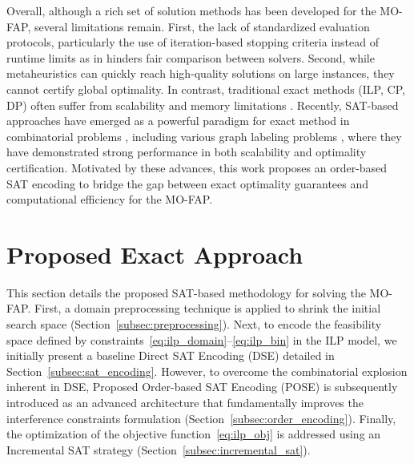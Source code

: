 \documentclass[letterpaper,journal]{IEEEtran}
\begin{document}
Overall, although a rich set of solution methods has been developed for the MO-FAP, several limitations remain. First, the lack of standardized evaluation protocols, particularly the use of iteration-based stopping criteria instead of runtime limits as in \cite{Gomez2023MO} hinders fair comparison between solvers. Second, while metaheuristics can quickly reach high-quality solutions on large instances, they cannot certify global optimality. In contrast, traditional exact methods (ILP, CP, DP) often suffer from scalability and memory limitations \cite{Aardal2007,Mahmoudi2023}. 
Recently, SAT-based approaches have emerged as a powerful paradigm for exact method in combinatorial problems \cite{fichte2023silent}, including various graph labeling problems \cite{glorian2019incremental, faber2024sat}, where they have demonstrated strong performance in both scalability and optimality certification. Motivated by these advances, this work proposes an order-based SAT encoding to bridge the gap between exact optimality guarantees and computational efficiency for the MO-FAP.

\section{Proposed Exact Approach}
\label{sec:method}
This section details the proposed SAT-based methodology for solving the MO-FAP.
First, a domain preprocessing technique is applied to shrink the initial search space (Section~\ref{subsec:preprocessing}). 
Next, to encode the feasibility space defined by constraints~\eqref{eq:ilp_domain}--\eqref{eq:ilp_bin} in the ILP model, we initially present a baseline Direct SAT Encoding (DSE) detailed in Section~\ref{subsec:sat_encoding}.
However, to overcome the combinatorial explosion inherent in DSE, Proposed Order-based SAT Encoding (POSE) is subsequently introduced as an advanced architecture that fundamentally improves the interference constraints formulation (Section~\ref{subsec:order_encoding}). Finally, the optimization of the objective function~\eqref{eq:ilp_obj} is addressed using an Incremental SAT strategy (Section~\ref{subsec:incremental_sat}).
\end{document}
